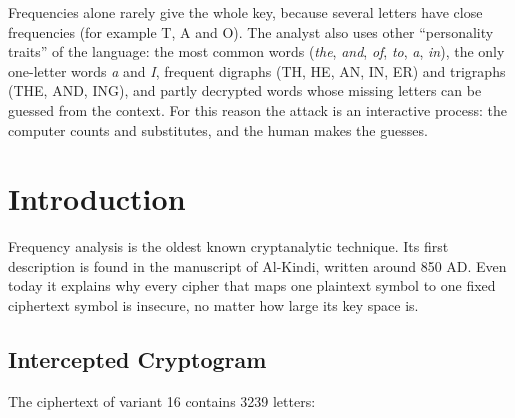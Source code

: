 \documentclass[12pt,a4paper]{article}
\begin{document}
Frequencies alone rarely give the whole key, because several letters have close
frequencies (for example T, A and O). The analyst also uses other ``personality traits'' of
the language: the most common words (\textit{the}, \textit{and}, \textit{of}, \textit{to},
\textit{a}, \textit{in}), the only one-letter words \textit{a} and \textit{I}, frequent
digraphs (TH, HE, AN, IN, ER) and trigraphs (THE, AND, ING), and partly decrypted words whose
missing letters can be guessed from the context. For this reason the attack is an
interactive process: the computer counts and substitutes, and the human makes the guesses.

\section{Introduction}

Frequency analysis is the oldest known cryptanalytic technique. Its first description is
found in the manuscript of Al-Kindi, written around 850 AD. Even today it explains why every
cipher that maps one plaintext symbol to one fixed ciphertext symbol is insecure, no matter
how large its key space is.

\subsection{Intercepted Cryptogram}

The ciphertext of variant 16 contains 3239 letters:
\end{document}
